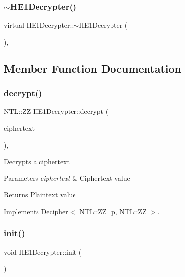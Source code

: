 \subsubsection{\texorpdfstring{$\sim$\+H\+E1\+Decrypter()}{~HE1Decrypter()}}
{\footnotesize\ttfamily virtual H\+E1\+Decrypter\+::$\sim$\+H\+E1\+Decrypter (\begin{DoxyParamCaption}{ }\end{DoxyParamCaption})\hspace{0.3cm}{\ttfamily [inline]}, {\ttfamily [virtual]}}



\subsection{Member Function Documentation}
\mbox{\label{classHE1Decrypter_a28cc03e8a37f321b8f805cc04b2e69e0}} 
\subsubsection{\texorpdfstring{decrypt()}{decrypt()}}
{\footnotesize\ttfamily N\+T\+L\+::\+ZZ H\+E1\+Decrypter\+::decrypt (\begin{DoxyParamCaption}\item[{N\+T\+L\+::\+Z\+Z\+\_\+p \&}]{ciphertext }\end{DoxyParamCaption})\hspace{0.3cm}{\ttfamily [override]}, {\ttfamily [virtual]}}

Decrypts a ciphertext 
\begin{DoxyParams}{Parameters}
{\em ciphertext} & Ciphertext value \\
\hline
\end{DoxyParams}
\begin{DoxyReturn}{Returns}
Plaintext value 
\end{DoxyReturn}


Implements \hyperlink{classDecipher_ac6b8c369eda2d7e17fa90cb594cf41b6}{Decipher$<$ N\+T\+L\+::\+Z\+Z\+\_\+p, N\+T\+L\+::\+Z\+Z $>$}.

\mbox{\label{classHE1Decrypter_ab10c6ecc422cbf5f492c7a039e2da97c}} 
\subsubsection{\texorpdfstring{init()}{init()}}
{\footnotesize\ttfamily void H\+E1\+Decrypter\+::init (\begin{DoxyParamCaption}{ }\end{DoxyParamCaption})}

